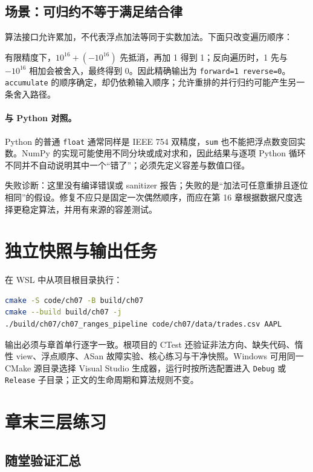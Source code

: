 \subsection{场景：可归约不等于满足结合律}

算法接口允许累加，不代表浮点加法等同于实数加法。下面只改变遍历顺序：



有限精度下，\(10^{16}+(-10^{16})\) 先抵消，再加 1 得到 1；反向遍历时，1 先与 \(-10^{16}\) 相加会被舍入，最终得到 0。因此精确输出为 \texttt{forward=1 reverse=0}。\texttt{accumulate} 的顺序确定，却仍依赖输入顺序；允许重排的并行归约可能产生另一条舍入路径。

\paragraph{与 Python 对照。}
Python 的普通 \texttt{float} 通常同样是 IEEE 754 双精度，\texttt{sum} 也不能把浮点数变回实数。NumPy 的实现可能使用不同分块或成对求和，因此结果与逐项 Python 循环不同并不自动说明其中一个“错了”；必须先定义容差与数值口径。

失败诊断：这里没有编译错误或 sanitizer 报告；失败的是“加法可任意重排且逐位相同”的假设。修复不应只是固定一次偶然顺序，而应在第 16 章根据数据尺度选择更稳定算法，并用有来源的容差测试。

\section{独立快照与输出任务}

在 WSL 中从项目根目录执行：

\begin{lstlisting}[language=bash]
cmake -S code/ch07 -B build/ch07
cmake --build build/ch07 -j
./build/ch07/ch07_ranges_pipeline code/ch07/data/trades.csv AAPL
\end{lstlisting}

输出必须与章首单行逐字一致。根项目的 CTest 还验证非法方向、缺失代码、惰性 view、浮点顺序、ASan 故障实验、核心练习与干净快照。Windows 可用同一 CMake 源目录选择 Visual Studio 生成器，运行时按所选配置进入 \texttt{Debug} 或 \texttt{Release} 子目录；正文的生命周期和算法规则不变。

\section{章末三层练习}

\subsection*{随堂验证汇总}

